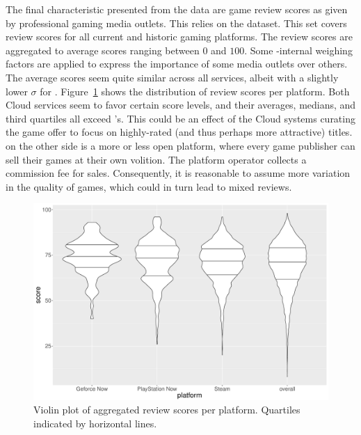 The final characteristic presented from the data are game review scores as
given by professional gaming media outlets. This relies on the
\metacritic dataset. This set covers review scores for all current
and historic gaming platforms. The review scores are aggregated to
average scores ranging between $0$ and $100$. Some \metacritic-internal
weighing factors are applied to express the importance of some media
outlets over others.
The average scores seem quite similar across all services, albeit with a
slightly lower $\sigma$ for \gfnow. Figure~\ref{fig:scores-by-platform}
shows the distribution of review scores per platform. Both Cloud
services seem to favor certain score levels, and their averages, medians,
and third quartiles all exceed \steam's.
This could be an effect of the Cloud
systems curating the game offer to focus on highly-rated (and thus
perhaps more attractive) titles. \steam on the other side is a more or
less open platform, where every game publisher can sell their games at
their own volition. The platform operator collects a commission fee for
sales. Consequently, it is reasonable to assume more variation in the
quality of games, which could in turn lead to mixed reviews.



\begin{figure}[!t]
	\centering
	\includegraphics[width=1.0\columnwidth]{images/scores-by-platform-violin.pdf}
	\caption{Violin plot of aggregated review scores per platform. Quartiles indicated by horizontal lines.}
\label{fig:scores-by-platform}
\end{figure}

